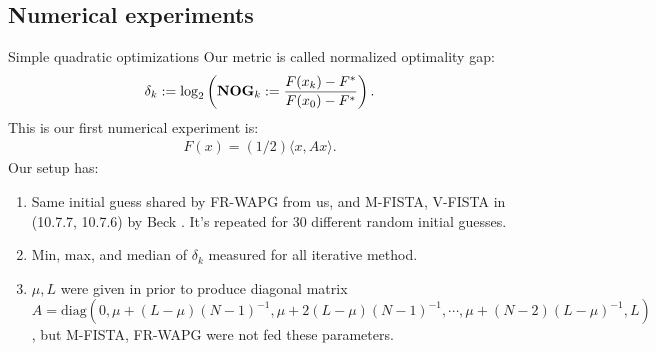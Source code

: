 \documentclass[11pt]{beamer}
\theoremstyle{definition}
\begin{document}
    \subsection{Numerical experiments}
        \begin{frame}{Simple quadratic optimizations}
            Our metric is called normalized optimality gap: 
            \newcommand{\NOG}{\text{\textbf{NOG}}}
            {\footnotesize
            \begin{align*}
                \delta_k := \log_2\left(
                    \NOG_k := \frac{F(x_k) - F^*}{F(x_0) - F^*}
                \right). 
            \end{align*}
            }
            This is our first numerical experiment is: 
            \begin{align*}
                F(x) = (1/2)\langle x, A x\rangle. 
            \end{align*}
            Our setup has: 
            \begin{enumerate}
                \item Same initial guess shared by FR-WAPG from us, and  M-FISTA, V-FISTA in (10.7.7, 10.7.6) by Beck \cite{beck_first-order_2017}. It's repeated for 30 different random initial guesses. 
                \item Min, max, and median of $\delta_k$ measured for all iterative method.
                \item $\mu, L$ were given in prior to produce diagonal matrix $A = \text{diag}(0, \mu + (L-\mu)(N - 1)^{-1}, \mu + 2(L-\mu)(N - 1)^{-1}, \cdots, \mu + (N - 2)(L - \mu)^{-1}, L)$, but M-FISTA, FR-WAPG were not fed these parameters. 
            \end{enumerate}
        \end{frame}
\end{document}
